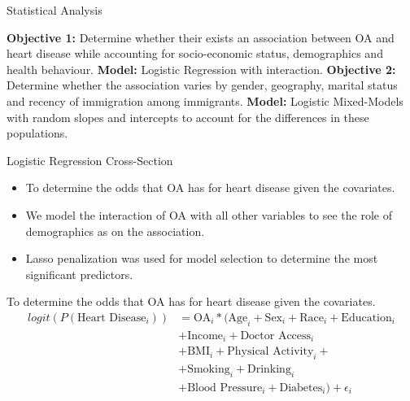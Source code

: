 

\begin{frame}{Statistical Analysis}
\begin{outline}
    \1 \textbf{Objective 1:} Determine whether their exists an association between OA and heart disease while accounting for socio-economic status, demographics and health behaviour.
        \2 \textbf{Model:} Logistic Regression with interaction.
    \1 \textbf{Objective 2:} Determine whether the association varies by gender, geography, marital status and recency of immigration among immigrants.
        \2 \textbf{Model:} Logistic Mixed-Models with random slopes and intercepts to account for the differences in these populations.
\end{outline}
\end{frame}

\begin{frame}{Logistic Regression Cross-Section}
\begin{itemize}
    \item To determine the odds that OA has for heart disease given the covariates.
    \item  We model the interaction of OA with all other variables to see the role of demographics as on the association.
    \item Lasso penalization was used for model selection to determine the most significant predictors. 
\end{itemize}
    To determine the odds that OA has for heart disease given the covariates.
\begin{align*}
        logit(P(\text{Heart Disease}_i))&=\text{OA}_i*(\text{Age}_i+\text{Sex}_i+\text{Race}_i+\text{Education}_i\\
        &+\text{Income}_i+\text{Doctor Access}_i\\
        &+\text{BMI}_i+\text{Physical Activity}_i+\\
        &+\text{Smoking}_i+\text{Drinking}_i\\
        &+\text{Blood Pressure}_i+\text{Diabetes}_i)+\epsilon_i\\
\end{align*}
    
\end{frame}


